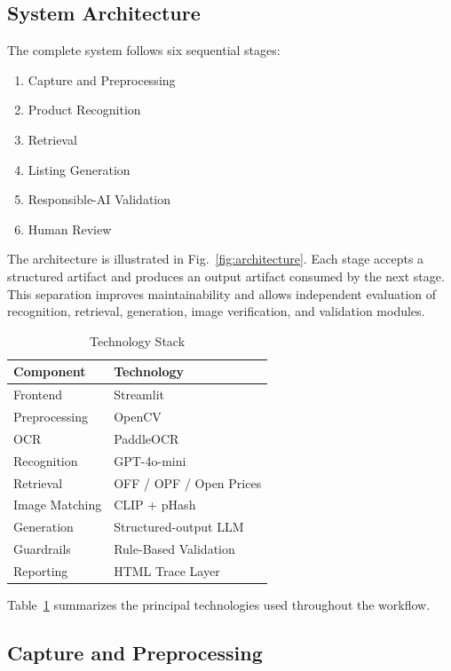\documentclass[conference]{IEEEtran}
\begin{document}
\subsection{System Architecture}

The complete system follows six sequential stages:

\begin{enumerate}
\item Capture and Preprocessing
\item Product Recognition
\item Retrieval
\item Listing Generation
\item Responsible-AI Validation
\item Human Review
\end{enumerate}

The architecture is illustrated in
Fig.~\ref{fig:architecture}.
Each stage accepts a structured artifact and produces an output
artifact consumed by the next stage. This separation improves
maintainability and allows independent evaluation of recognition,
retrieval, generation, image verification, and validation modules.

\begin{table}[t]
\caption{Technology Stack}
\label{tab:stack}
\centering
\begin{tabular}{ll}
\toprule
Component & Technology \\
\midrule
Frontend & Streamlit \\
Preprocessing & OpenCV \\
OCR & PaddleOCR \\
Recognition & GPT-4o-mini \\
Retrieval & OFF / OPF / Open Prices \\
Image Matching & CLIP + pHash \\
Generation & Structured-output LLM \\
Guardrails & Rule-Based Validation \\
Reporting & HTML Trace Layer \\
\bottomrule
\end{tabular}
\end{table}

Table~\ref{tab:stack} summarizes the principal technologies
used throughout the workflow.

\subsection{Capture and Preprocessing}
\end{document}
